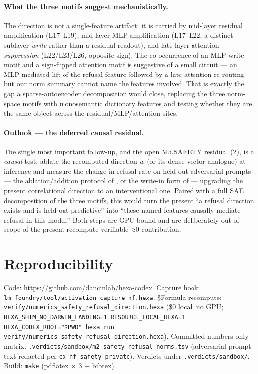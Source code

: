 \documentclass[11pt,a4paper]{article}
\begin{document}
\paragraph{What the three motifs suggest mechanistically.} The direction is not
a single-feature artifact: it is carried by mid-layer residual amplification
(L17--L19), mid-layer MLP amplification (L17--L22, a distinct sublayer
\emph{write} rather than a residual readout), and late-layer attention
\emph{suppression} (L22/L23/L26, opposite sign). The co-occurrence of an MLP
write motif and a sign-flipped attention motif is suggestive of a small circuit
--- an MLP-mediated lift of the refusal feature followed by a late attention
re-routing --- but our norm summary cannot name the features involved. That is
exactly the gap a sparse-autoencoder decomposition \citep{cunningham2023sae,
bricken2023monosemanticity} would close, replacing the three norm-space motifs
with monosemantic dictionary features and testing whether they are the same
object across the residual/MLP/attention sites.

\paragraph{Outlook --- the deferred causal residual.} The single most important
follow-up, and the open M5.SAFETY residual (2), is a \emph{causal} test:
ablate the recomputed direction \(w\) (or its dense-vector analogue) at
inference and measure the change in refusal rate on held-out adversarial
prompts --- the ablation/addition protocol of \citet{arditi2024refusal}, or the
write-in form of \citet{turner2023actadd} --- upgrading the present
correlational direction to an interventional one. Paired with a full SAE
decomposition of the three motifs, this would turn the present ``a refusal
direction exists and is held-out predictive'' into ``these named features
causally mediate refusal in this model.'' Both steps are GPU-bound and are
deliberately out of scope of the present recompute-verifiable, \$0 contribution.

\section*{Reproducibility}
Code: \url{https://github.com/dancinlab/hexa-codex}. Capture hook:
\texttt{lm\_foundry/tool/activation\_capture\_hf.hexa}. \S Formula recompute:
\texttt{verify/numerics\_safety\_refusal\_direction.hexa} (\$0 local, no GPU;
\texttt{HEXA\_SHIM\_NO\_DARWIN\_LANDING=1 RESOURCE\_LOCAL\_HEXA=1
HEXA\_CODEX\_ROOT="\$PWD" hexa run
verify/numerics\_safety\_refusal\_direction.hexa}). Committed numbers-only
matrix: \texttt{.verdicts/sandbox/m2\_safety\_refusal\_norms.tsv} (adversarial
prompt text redacted per \texttt{cx\_hf\_safety\_private}). Verdicts under
\texttt{.verdicts/sandbox/}. Build: \texttt{make} (pdflatex \(\times\) 3 \(+\)
bibtex).
\end{document}
